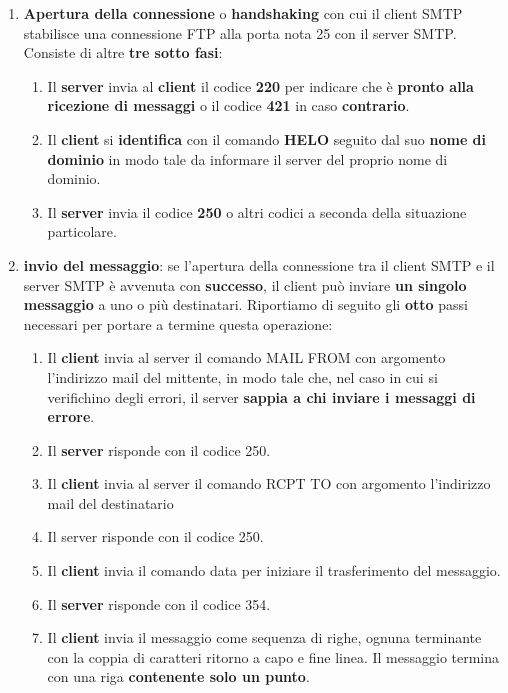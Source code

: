 \documentclass[11pt,a4paper]{article}
\theoremstyle{definition}
\begin{document}
\begin{enumerate}
	\item \textbf{Apertura della connessione} o \textbf{handshaking} con cui il client SMTP stabilisce una connessione FTP alla porta nota 25 con il server SMTP. Consiste di altre \textbf{tre sotto fasi}:
	      \begin{enumerate}[label*=\arabic*.]
		      \item Il \textbf{server} invia al \textbf{client} il codice \textbf{220} per indicare che è \textbf{pronto alla ricezione di messaggi} o il codice \textbf{421} in caso \textbf{contrario}.
		      \item Il \textbf{client} si \textbf{identifica} con il comando \textbf{HELO} seguito dal suo \textbf{nome di dominio} in modo tale da informare il server del proprio nome di dominio.
		      \item Il \textbf{server} invia il codice \textbf{250} o altri codici a seconda della situazione particolare.
	      \end{enumerate}
	\item \textbf{invio del messaggio}: se l'apertura della connessione tra il client SMTP e il server SMTP è avvenuta con \textbf{successo}, il client può inviare \textbf{un singolo messaggio} a uno o più destinatari. Riportiamo di seguito gli \textbf{otto} passi necessari per portare a termine questa operazione:
	      \begin{enumerate}[label*=\arabic*.]
		      \item Il \textbf{client} invia al server il comando MAIL FROM con argomento l'indirizzo mail del mittente, in modo tale che, nel caso in cui si verifichino degli  errori, il server \textbf{sappia a chi inviare i messaggi di errore}.
		      \item Il \textbf{server} risponde con il codice 250.
		      \item Il \textbf{client} invia al server il comando RCPT TO con argomento l'indirizzo mail del destinatario
		      \item Il server risponde con il codice 250.
		      \item Il \textbf{client} invia il comando data per iniziare il trasferimento del messaggio.
		      \item Il \textbf{server} risponde con il codice 354.
		      \item Il \textbf{client} invia il messaggio come sequenza di righe, ognuna terminante con la coppia di caratteri ritorno a capo e fine linea. Il messaggio termina con una riga \textbf{contenente solo un punto}.

\end{enumerate}
\end{enumerate}
\end{document}
